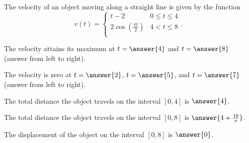 \documentclass{ximera}
\author{Nela Lakos \and Kyle Parsons}
\begin{document}
\begin{exercise}

The velocity of an object moving along a straight line is given by the function
\[
v(t) = 
\begin{cases}
t-2 & 0\leq t\leq4\\
2\cos\left(\frac{\pi t}{2}\right) & 4<t\leq8\\
\end{cases}.
\]

The velocity attains its maximum at $t=\answer{4}$ and $t=\answer{8}$ (answer from left to right).

The velocity is zero at $t=\answer{2}$, $t=\answer{5}$, and $t=\answer{7}$ (answer from left to right).

The total distance the object travels on the interval $[0,4]$ is $\answer{4}$.

The total distance the object travels on the interval $[0,8]$ is $\answer{4+\frac{16}{\pi}}$.

The displacement of the object on the interval $[0,8]$ is $\answer{0}$.

\end{exercise}
\end{document}

